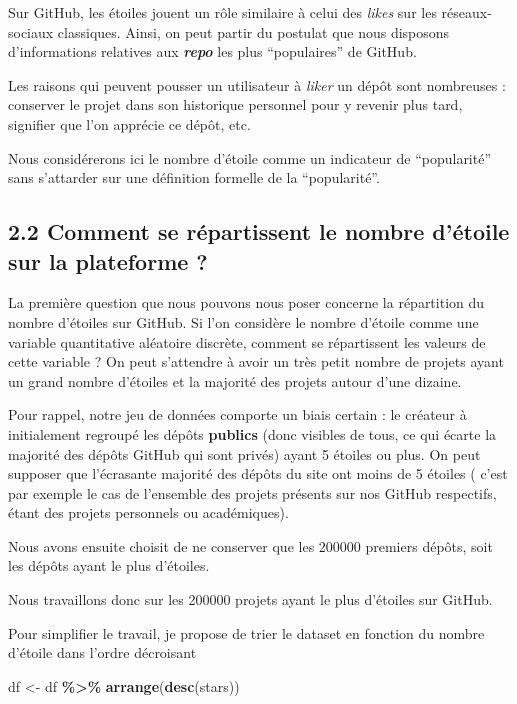 \documentclass[
]{article}
\newenvironment{Shaded}{\begin{snugshade}}{\end{snugshade}}
\newcommand{\FunctionTok}[1]{\textcolor[rgb]{0.13,0.29,0.53}{\textbf{#1}}}
\newcommand{\NormalTok}[1]{#1}
\newcommand{\OtherTok}[1]{\textcolor[rgb]{0.56,0.35,0.01}{#1}}
\newcommand{\SpecialCharTok}[1]{\textcolor[rgb]{0.81,0.36,0.00}{\textbf{#1}}}
\begin{document}
Sur GitHub, les étoiles jouent un rôle similaire à celui des
\emph{likes} sur les réseaux-sociaux classiques. Ainsi, on peut partir
du postulat que nous disposons d'informations relatives aux
\textbf{\emph{repo}} les plus ``populaires'' de GitHub.

Les raisons qui peuvent pousser un utilisateur à \emph{liker} un dépôt
sont nombreuses : conserver le projet dans son historique personnel pour
y revenir plus tard, signifier que l'on apprécie ce dépôt, etc.

Nous considérerons ici le nombre d'étoile comme un indicateur de
``popularité'' sans s'attarder sur une définition formelle de la
``popularité''.

\subsection{2.2 Comment se répartissent le nombre d'étoile sur la
plateforme
?}\label{comment-se-ruxe9partissent-le-nombre-duxe9toile-sur-la-plateforme}

La première question que nous pouvons nous poser concerne la répartition
du nombre d'étoiles sur GitHub. Si l'on considère le nombre d'étoile
comme une variable quantitative aléatoire discrète, comment se
répartissent les valeurs de cette variable ? On peut s'attendre à avoir
un très petit nombre de projets ayant un grand nombre d'étoiles et la
majorité des projets autour d'une dizaine.

Pour rappel, notre jeu de données comporte un biais certain : le
créateur à initialement regroupé les dépôts \textbf{publics} (donc
visibles de tous, ce qui écarte la majorité des dépôts GitHub qui sont
privés) ayant 5 étoiles ou plus. On peut supposer que l'écrasante
majorité des dépôts du site ont moins de 5 étoiles ( c'est par exemple
le cas de l'ensemble des projets présents sur nos GitHub respectifs,
étant des projets personnels ou académiques).

Nous avons ensuite choisit de ne conserver que les 200000 premiers
dépôts, soit les dépôts ayant le plus d'étoiles.

Nous travaillons donc sur les 200000 projets ayant le plus d'étoiles sur
GitHub.

Pour simplifier le travail, je propose de trier le dataset en fonction
du nombre d'étoile dans l'ordre décroisant

\begin{Shaded}
\begin{Highlighting}[]
\NormalTok{df }\OtherTok{\textless{}{-}}\NormalTok{ df }\SpecialCharTok{\%\textgreater{}\%} \FunctionTok{arrange}\NormalTok{(}\FunctionTok{desc}\NormalTok{(stars))}
\end{Highlighting}
\end{Shaded}
\end{document}
